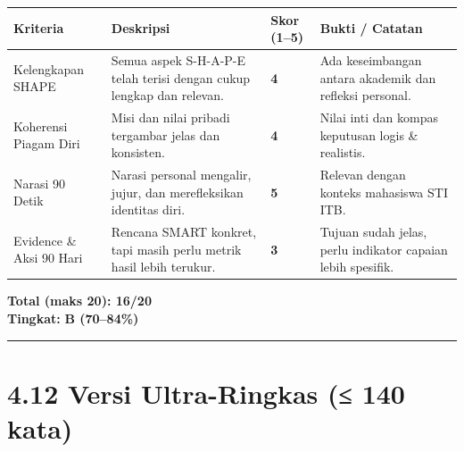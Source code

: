 \documentclass[
  letterpaper,
  DIV=11,
  numbers=noendperiod]{scrreprt}
\begin{document}
\begin{longtable}[]{@{}
  >{\raggedright\arraybackslash}p{}
  >{\raggedright\arraybackslash}p{}
  >{\centering\arraybackslash}p{}
  >{\raggedright\arraybackslash}p{}@{}}
\toprule\noalign{}
\begin{minipage}[b]{\linewidth}\raggedright
\textbf{Kriteria}
\end{minipage} & \begin{minipage}[b]{\linewidth}\raggedright
\textbf{Deskripsi}
\end{minipage} & \begin{minipage}[b]{\linewidth}\centering
\textbf{Skor (1--5)}
\end{minipage} & \begin{minipage}[b]{\linewidth}\raggedright
\textbf{Bukti / Catatan}
\end{minipage} \\
\midrule\noalign{}
\endhead
\bottomrule\noalign{}
\endlastfoot
Kelengkapan SHAPE & Semua aspek S-H-A-P-E telah terisi dengan cukup
lengkap dan relevan. & \textbf{4} & Ada keseimbangan antara akademik dan
refleksi personal. \\
Koherensi Piagam Diri & Misi dan nilai pribadi tergambar jelas dan
konsisten. & \textbf{4} & Nilai inti dan kompas keputusan logis \&
realistis. \\
Narasi 90 Detik & Narasi personal mengalir, jujur, dan merefleksikan
identitas diri. & \textbf{5} & Relevan dengan konteks mahasiswa STI
ITB. \\
Evidence \& Aksi 90 Hari & Rencana SMART konkret, tapi masih perlu
metrik hasil lebih terukur. & \textbf{3} & Tujuan sudah jelas, perlu
indikator capaian lebih spesifik. \\
\end{longtable}

\textbf{Total (maks 20): 16/20}\\
\textbf{Tingkat:} \textbf{B (70--84\%)}

\begin{center}\rule{0.5\linewidth}{0.5pt}\end{center}

\section{4.12 Versi Ultra-Ringkas (≤ 140
kata)}\label{versi-ultra-ringkas-140-kata}
\end{document}
